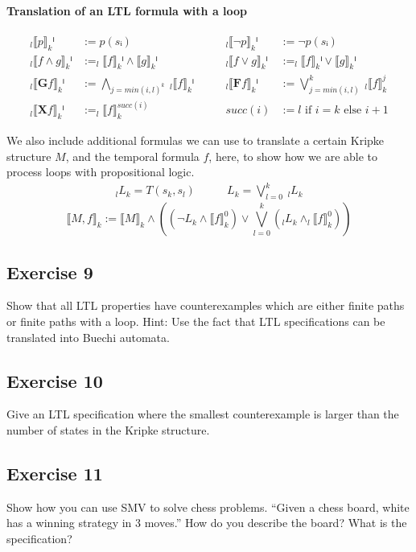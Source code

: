 \documentclass[a4paper, 12pt]{article}
\begin{document}
\paragraph{Translation of an LTL formula with a loop}
\begin{alignat*}{2}
    _l⟦p⟧_kⁱ            &:= p(sᵢ)\quad\quad&
    _l⟦¬p⟧_kⁱ           &:= ¬ p(sᵢ)\\
    _l⟦f ∧ g⟧_kⁱ        &:= _l⟦f⟧_kⁱ ∧ ⟦g⟧_kⁱ\quad\quad&
    _l⟦f ∨ g⟧_kⁱ        &:= _l⟦f⟧_kⁱ ∨ ⟦g⟧_kⁱ\\
    _l⟦\mathbf{G} f⟧_kⁱ &:= ⋀_{j=min(i,l)^k} ~ _l⟦f⟧_kⁱ\quad\quad&
    _l⟦\mathbf{F} f⟧_kⁱ &:= ⋁_{j=min(i,l)}^k ~ _l⟦f⟧_k^{j}\\
    _l⟦\mathbf{X} f⟧_kⁱ &:= _l⟦f⟧_k^{succ(i)}\quad\quad&
    succ(i)             &:= l \text{ if } i = k \text{ else } i+1
\end{alignat*}

We also include additional formulas we can use to translate a certain Kripke
structure $M$, and the temporal formula $f$, here, to show how we are able to
process loops with propositional logic.
\begin{alignat*}{2}
    _l L _k = T(s_k, s_l)\quad\quad&
    L_k = ⋁_{l=0}^k ~ _l L _k
\end{alignat*}
\[
    ⟦M, f⟧_k := ⟦M⟧_k ∧
    \left(
          \left( ¬ L_k ∧ ⟦f⟧_k^0 \right) ∨
          ⋁_{l=0}^k \left( _l L _k ∧ _l ⟦ f ⟧_k^0 \right)
    \right)
\]

\subsection{Exercise 9}

Show that all LTL properties have counterexamples which are either finite
paths or finite paths with a loop. Hint: Use the fact that LTL specifications
can be translated into Buechi automata.

\subsection{Exercise 10}

Give an LTL specification where the smallest counterexample is larger than the
number of states in the Kripke structure.

\subsection{Exercise 11}

Show how you can use SMV to solve chess problems. “Given a chess board, white
has a winning strategy in 3 moves.” How do you describe the board? What is
the specification?


\titleformat{\section}{\sffamily\bfseries}{}{0pt}{}[{\color{aqua}\hrule}]
\printbibliography
\end{document}
